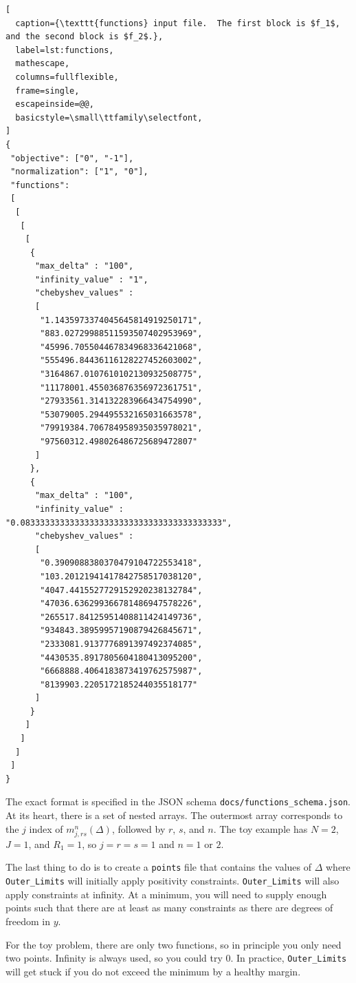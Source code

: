 \documentclass[12pt]{article}
\numberwithin{equation}{section}
\begin{document}
\begin{lstlisting}[
  caption={\texttt{functions} input file.  The first block is $f_1$, and the second block is $f_2$.},
  label=lst:functions,
  mathescape,
  columns=fullflexible,
  frame=single,
  escapeinside=@@,
  basicstyle=\small\ttfamily\selectfont,
]
{
 "objective": ["0", "-1"],
 "normalization": ["1", "0"],
 "functions":
 [
  [
   [
    [
     {
      "max_delta" : "100",
      "infinity_value" : "1",
      "chebyshev_values" :
      [
       "1.1435973374045645814919250171",
       "883.02729988511593507402953969",
       "45996.705504467834968336421068",
       "555496.84436116128227452603002",
       "3164867.0107610102130932508775",
       "11178001.455036876356972361751",
       "27933561.314132283966434754990",
       "53079005.294495532165031663578",
       "79919384.706784958935035978021",
       "97560312.498026486725689472807"
      ]
     },
     {
      "max_delta" : "100",
      "infinity_value" : "0.08333333333333333333333333333333333333333",
      "chebyshev_values" :
      [
       "0.3909088380370479104722553418",
       "103.20121941417842758517038120",
       "4047.4415527729152920238132784",
       "47036.636299366781486947578226",
       "265517.84125951408811424149736",
       "934843.38959957190879426845671",
       "2333081.9137776891397492374085",
       "4430535.8917805604180413095200",
       "6668888.4064183873419762575987",
       "8139903.2205172185244035518177"
      ]
     }
    ]
   ]
  ]
 ]
}
\end{lstlisting}

The exact format is specified in the JSON schema
\texttt{docs/functions\_schema.json}.  At its heart, there is a set of
nested arrays.  The outermost array corresponds to the $j$ index of
$m_{j,rs}^{n}(\Delta)$, followed by $r$, $s$, and $n$.  The toy
example has $N=2$, $J=1$, and $R_{1}=1$, so $j=r=s=1$ and $n=1$ or
$2$.

The last thing to do is to create a \texttt{points} file that contains
the values of $\Delta$ where \texttt{Outer\_Limits} will initially
apply positivity constraints.  \texttt{Outer\_Limits} will also apply
constraints at infinity.  At a minimum, you will need to supply enough
points such that there are at least as many constraints as there are
degrees of freedom in $y$.

For the toy problem, there are only two functions, so in principle you
only need two points.  Infinity is always used, so you could try $0$.
In practice, \texttt{Outer\_Limits} will get stuck if you do not
exceed the minimum by a healthy margin.
\end{document}
